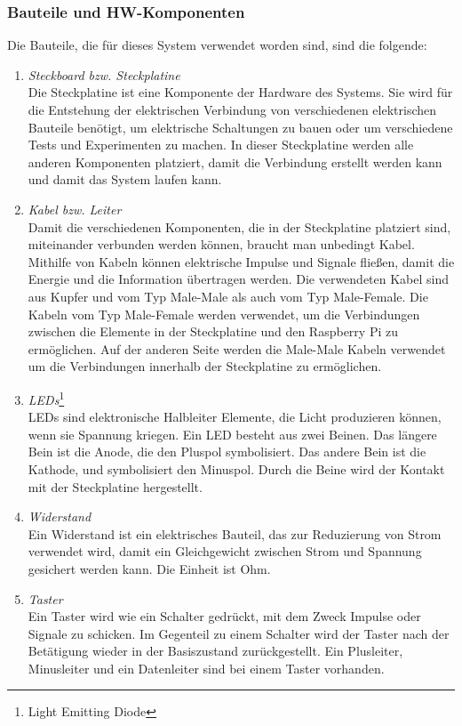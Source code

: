 \subsubsection{Bauteile und HW-Komponenten}
Die Bauteile, die für dieses System verwendet worden sind, sind die folgende:
\begin{enumerate}
	\item \textit{Steckboard bzw. Steckplatine}\\ 
	Die Steckplatine ist eine Komponente der Hardware des Systems. Sie wird für die Entstehung der elektrischen Verbindung von verschiedenen elektrischen Bauteile benötigt, um elektrische Schaltungen zu bauen oder um verschiedene Tests und Experimenten zu machen. In dieser Steckplatine werden alle anderen Komponenten platziert, damit die Verbindung erstellt werden kann und damit das System laufen kann.
	\item \textit{Kabel bzw. Leiter} \\
	Damit die verschiedenen Komponenten, die in der Steckplatine platziert sind, miteinander verbunden werden können, braucht man unbedingt Kabel. Mithilfe von Kabeln können elektrische Impulse und Signale fließen, damit die Energie und die Information übertragen werden. Die verwendeten Kabel sind aus Kupfer und vom Typ Male-Male als auch vom Typ Male-Female. Die Kabeln vom Typ Male-Female werden verwendet, um die Verbindungen zwischen die Elemente in der Steckplatine und den Raspberry Pi zu ermöglichen. Auf der anderen Seite werden die Male-Male Kabeln verwendet um die Verbindungen innerhalb der Steckplatine zu ermöglichen.
	\item \textit{LEDs}\footnote{Light Emitting Diode} \\
	LEDs sind elektronische Halbleiter Elemente, die Licht produzieren können, wenn sie Spannung kriegen. Ein LED besteht aus zwei Beinen. Das längere Bein ist die Anode, die den Pluspol symbolisiert. Das andere Bein ist die Kathode, und symbolisiert den Minuspol. Durch die Beine wird der Kontakt mit der Steckplatine hergestellt.
	\item \textit{Widerstand} \\
	Ein Widerstand ist ein elektrisches Bauteil, das zur Reduzierung von Strom verwendet wird, damit ein Gleichgewicht zwischen Strom und Spannung gesichert werden kann. Die Einheit ist Ohm.
	\item \textit{Taster} \\
	Ein Taster wird wie ein Schalter gedrückt, mit dem Zweck Impulse oder Signale zu schicken. Im Gegenteil zu einem Schalter wird der Taster nach der Betätigung  wieder in der Basiszustand zurückgestellt. Ein Plusleiter, Minusleiter und ein Datenleiter sind bei einem Taster vorhanden.\cite{Taster}

\end{enumerate}
